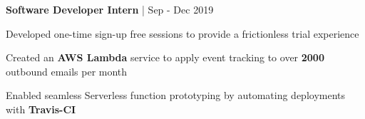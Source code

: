 \begin{cventries}

\cventry
{\textbf{Software Developer Intern} | \color{awesome}{ROSS Intelligence}}
{Sep - Dec 2019} %
{ %
\begin{cvitems}
\item {Developed one-time sign-up free sessions to provide a frictionless trial experience}
\item {Created an \textbf{AWS Lambda} service to apply event tracking to over \textbf{2000} outbound emails per month}
\item {Enabled seamless Serverless function prototyping by automating deployments with \textbf{Travis-CI}}
\end{cvitems}
}








\end{cventries}
